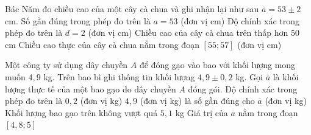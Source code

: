 \begin{ex}%
	Bác Năm đo chiều cao của một cây cà chua và ghi nhận lại như sau $\overline{a}=53\pm 2$ cm.
	\choiceTF
	{\True Số gần đúng trong phép đo trên là $a=53$ (đơn vị cm)}
	{\True Độ chính xác trong phép đo trên là $d=2$ (đơn vị cm)}
	{Chiều cao của cây cà chua trên thấp hơn $50$ cm}
	{Chiều cao thực của cây cà chua nằm trong đoạn $[55;57]$ (đơn vị cm)}
\end{ex}
\begin{ex}%
	Một công ty sử dụng dây chuyền $A$ để đóng gạo vào bao với khối lượng mong muốn $4{,}9$ kg. Trên bao bì ghi thông tin khối lượng $4{,}9 \pm 0{,}2$ kg. Gọi $\overline{a}$ là khối lượng thực tế của một bao gạo do dây chuyền $A$ đóng gói.
	\choiceTF
	{\True Độ chính xác trong phép đo trên là $0{,}2$ (đơn vị kg)}
	{\True $4{,}9$ (đơn vị kg) là số gần đúng cho $\overline{a}$ (đơn vị kg)}
	{\True Khối lượng bao gạo trên không vượt quá $5{,}1$ kg}
	{Giá trị của $\overline{a}$ nằm trong đoạn $[4{,}8; 5]$}
\end{ex}
